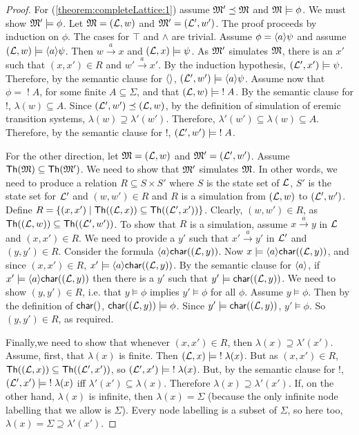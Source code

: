 \begin{proof}
For (\ref{theorem:completeLattice:1}) assume $\frak{M}' \preceq \frak{M}$
and $\frak{M} \models \phi$.  We must show $\frak{M}' \models \phi$.  Let
$\frak{M} = (\mathcal{L}, w)$ and $\frak{M}' = (\mathcal{L}', w')$.  The proof proceeds by
induction on $\phi$.  The cases for $\top$ and $\land$ are trivial.
Assume $\phi = \langle a \rangle \psi$ and assume $(\mathcal{L}, w) \models
\langle a \rangle \psi$.  Then $w \xrightarrow{a} x$ and $(\mathcal{L}, x) \models
\psi$.  As $\frak{M}'$ simulates $\frak{M}$, there is an $x'$ such that
$(x,x') \in R$ and $w' \xrightarrow{a} x'$.  By the induction
hypothesis, $(\mathcal{L}', x') \models \psi$.  Therefore, by the semantic
clause for $\MAY{}$, $(\mathcal{L}', w') \models \langle a \rangle \psi$.  Assume now
that $\phi = \; ! \; A$, for some finite $A \subseteq \Sigma$, and
that $(\mathcal{L}, w) \models \; ! \; A$.  By the semantic clause for $!$,
$\lambda(w) \subseteq A$.  Since $(\mathcal{L}', w') \preceq (\mathcal{L}, w)$, by
the definition of simulation of eremic transition systems, $\lambda(w)
\supseteq \lambda'(w')$.  Therefore, $\lambda'(w') \subseteq
\lambda(w) \subseteq A$.  Therefore, by the semantic clause for $!$,
$(\mathcal{L}', w') \models \; ! \; A$.

For the other direction, let $\frak{M} = (\mathcal{L}, w)$ and $\frak{M}' = (\mathcal{L}',
w')$.  Assume $\mathsf{Th}(\frak{M}) \subseteq \mathsf{Th}(\frak{M}') $. We need to
show that $\frak{M}'$ simulates $\frak{M}$.  In other words, we need to
produce a relation $R \subseteq S \times S'$ where $S$ is the state
set of $\mathcal{L}$, $S'$ is the state set for $\mathcal{L}'$ and $(w,w') \in R$
and $R$ is a simulation from $(\mathcal{L}, w)$ to $ (\mathcal{L}', w')$.  Define $R
= \{(x,x') \; | \; \mathsf{Th}( (\mathcal{L}, x)) \subseteq \mathsf{Th}( (\mathcal{L}',
  x'))\}$.  Clearly, $(w,w') \in R$, as $\mathsf{Th}((\mathcal{L}, w)) \subseteq
\mathsf{Th}((\mathcal{L}', w')) $.  To show that $R$ is a simulation, assume $x
\xrightarrow{a} y$ in $\mathcal{L}$ and $(x,x') \in R$. 
We need to provide a
$y'$ such that $x' \xrightarrow{a} y'$ in $\mathcal{L}'$ and $(y,y') \in R$.  
Consider the formula $\langle a \rangle \mathsf{char}((\mathcal{L}, y))$. 
Now $x \models \langle a \rangle \mathsf{char}((\mathcal{L}, y))$, and since $(x,x') \in R$, $x' \models \langle a \rangle \mathsf{char}((\mathcal{L}, y))$.
By the semantic clause for $\MAY{a}$, if $x' \models \langle a \rangle \mathsf{char}((\mathcal{L}, y))$ then there is a $y'$ such that 
$y' \models \mathsf{char}((\mathcal{L}, y))$.
We need to show $(y,y') \in R$, i.e. that $y \models \phi$ implies $y' \models \phi$ for all $\phi$.
Assume $y \models \phi$. 
Then by the definition of $\CHAR$, $\mathsf{char}((\mathcal{L}, y)) \models \phi$.
Since $y' \models \mathsf{char}((\mathcal{L}, y))$, $y' \models \phi$. 
So $(y,y') \in R$, as required.

Finally,we need to show that whenever $(x,x') \in R$, then $\lambda(x)
\supseteq \lambda'(x')$.  Assume, first, that $\lambda(x)$ is finite.
Then $(\mathcal{L}, x) \models \; ! \; \lambda(x)$.  But as $(x,x') \in R$,
$\mathsf{Th}((\mathcal{L}, x)) \subseteq \mathsf{Th}((\mathcal{L}', x')) $, so $(\mathcal{L}', x')
\models \; ! \; \lambda(x)$.  But, by the semantic clause for $!$,
$(\mathcal{L}', x') \models \; ! \; \lambda(x)$ iff $\lambda'(x') \subseteq
\lambda(x)$.  Therefore $\lambda(x) \supseteq \lambda'(x')$.  If, on
the other hand, $\lambda(x)$ is infinite, then $\lambda(x) = \Sigma$
(because the only infinite node labelling that we allow is
$\Sigma$). Every node labelling is a subset of $\Sigma$, so here too,
$\lambda(x) = \Sigma \supseteq \lambda'(x')$.  


\end{proof}
